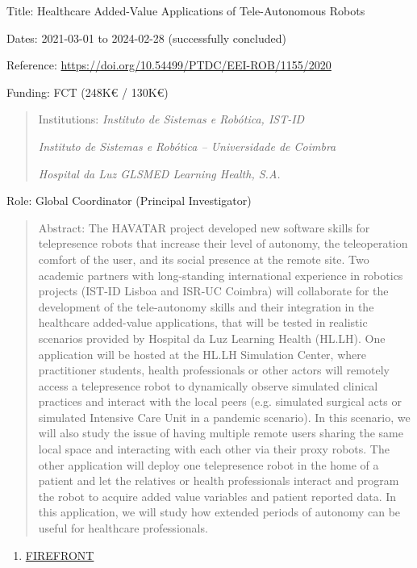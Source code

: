 \documentclass[
]{article}
\begin{document}
Title: Healthcare Added-Value Applications of Tele-Autonomous Robots

Dates: 2021-03-01 to 2024-02-28 (successfully concluded)

Reference: \url{https://doi.org/10.54499/PTDC/EEI-ROB/1155/2020}

Funding: FCT (248K€ / 130K€)

\begin{quote}
Institutions: \emph{Instituto de Sistemas e Robótica, IST-ID}

\emph{Instituto de Sistemas e Robótica -- Universidade de Coimbra}

\emph{Hospital da Luz GLSMED Learning Health, S.A.}
\end{quote}

Role: Global Coordinator (Principal Investigator)

\begin{quote}
Abstract: The HAVATAR project developed new software skills for
telepresence robots that increase their level of autonomy, the
teleoperation comfort of the user, and its social presence at the remote
site. Two academic partners with long-standing international experience
in robotics projects (IST-ID Lisboa and ISR-UC Coimbra) will collaborate
for the development of the tele-autonomy skills and their integration in
the healthcare added-value applications, that will be tested in
realistic scenarios provided by Hospital da Luz Learning Health (HL.LH).
One application will be hosted at the HL.LH Simulation Center, where
practitioner students, health professionals or other actors will
remotely access a telepresence robot to dynamically observe simulated
clinical practices and interact with the local peers (e.g. simulated
surgical acts or simulated Intensive Care Unit in a pandemic scenario).
In this scenario, we will also study the issue of having multiple remote
users sharing the same local space and interacting with each other via
their proxy robots. The other application will deploy one telepresence
robot in the home of a patient and let the relatives or health
professionals interact and program the robot to acquire added value
variables and patient reported data. In this application, we will study
how extended periods of autonomy can be useful for healthcare
professionals.
\end{quote}

\begin{enumerate}
\def\labelenumi{\arabic{enumi}.}
\setcounter{enumi}{1}
\item
  \ul{FIREFRONT}
\end{enumerate}
\end{document}

